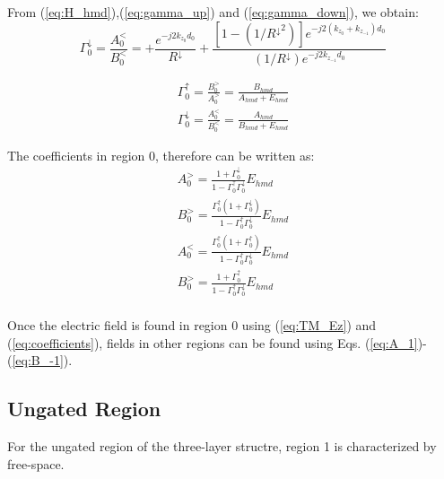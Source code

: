 \documentclass{article}
\begin{document}
  From (\ref{eq:H_hmd}),(\ref{eq:gamma_up}) and (\ref{eq:gamma_down}), we obtain:
  \begin{equation}
    \Gamma_0^{\downarrow} = \frac{A_0^<}{B_0^<} = +\frac{e^{-j2k_{z_0} d_0}}{R^{\downarrow}} + \frac{ \left[ 1 - (1/{R^{\downarrow}}^2) \right]e^{-j2(k_{z_0} + k_{z_{-1}}) d_0}}{(1/R^{\downarrow})e^{-j2k_{z_{-1}} d_0}}
    \label{eq:gamma_down}
  \end{equation}

  \begin{subequations}
    \begin{align}
      \Gamma_0^{\uparrow} = \frac{B_0^>}{A_0^>} = \frac{B_{hmd}}{A_{hmd} + E_{hmd}}
      \label{eq:gamma_0_up} \\
      \Gamma_0^{\downarrow} = \frac{A_0^<}{B_0^<} = \frac{A_{hmd}}{B_{hmd} + E_{hmd}}
      \label{eq:gamma_0_down}
    \end{align}
    \label{eq:gammas}
  \end{subequations}

  The coefficients in region 0, therefore can be written as:
  \begin{subequations}
    \begin{align}
      A_0^> = \frac{1 + \Gamma_0^{\downarrow}}{1- \Gamma_0^{\uparrow} \Gamma_0^{\downarrow}} E_{hmd}
      \label{eq:A0up} \\
      B_0^> = \frac{\Gamma_0^{\uparrow}(1 + \Gamma_0^{\downarrow})}{1- \Gamma_0^{\uparrow} \Gamma_0^{\downarrow}} E_{hmd}
      \label{eq:B0up} \\
      A_0^< = \frac{\Gamma_0^{\uparrow}(1 + \Gamma_0^{\uparrow})}{1- \Gamma_0^{\uparrow} \Gamma_0^{\downarrow}} E_{hmd}
      \label{eq:A0up} \\
      B_0^> = \frac{1 + \Gamma_0^{\uparrow}}{1- \Gamma_0^{\uparrow} \Gamma_0^{\downarrow}} E_{hmd}
      \label{eq:B0up} \\
    \end{align}
    \label{eq:coefficients}
  \end{subequations}

  Once the electric field is found in region 0 using (\ref{eq:TM_Ez}) and (\ref{eq:coefficients}), fields in other regions can be found using Eqs. (\ref{eq:A_1})-(\ref{eq:B_-1}).

  \subsection{Ungated Region}

  For the ungated region of the three-layer structre, region 1 is characterized by free-space.



  
  
\end{document}

